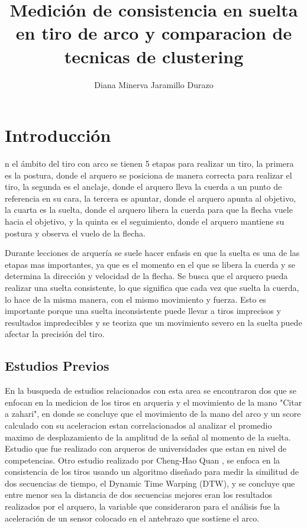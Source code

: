 \documentclass[11pt,a4paper,twocolumn,twoside]{rho-class/rho}
\title{Medición de consistencia en 
suelta en tiro de arco y comparacion de tecnicas de clustering}
\author[a]{Diana Minerva Jaramillo Durazo}
\affil[a]{Centro de Investigación Científica y de Educación Superior de Ensenada, Baja California, México.}
\begin{document}
    \maketitle
    \thispagestyle{firststyle}


\section{Introducción}

    n el ámbito del tiro con arco se tienen 5 etapas para realizar un tiro, la primera es la postura, donde el arquero se posiciona de manera correcta para realizar el tiro, la segunda es el anclaje, donde el arquero lleva la cuerda a un punto de referencia en su cara, la tercera es apuntar, donde el arquero apunta al objetivo, la cuarta es la suelta, donde el arquero libera la cuerda para que la flecha vuele hacia el objetivo, y la quinta es el seguimiento, donde el arquero mantiene su postura y observa el vuelo de la flecha. \cite{archerystages}
	
    Durante lecciones de arquería se suele hacer enfasis en que la suelta es una de las etapas mas importantes, ya que es el momento en el que se libera la cuerda y se determina la dirección y velocidad de la flecha. Se busca que el arquero pueda realizar una suelta consistente, lo que significa que cada vez que suelta la cuerda, lo hace de la misma manera, con el mismo movimiento y fuerza. Esto es importante porque una suelta inconsistente puede llevar a tiros imprecisos y resultados impredecibles y se teoriza que un movimiento severo en la suelta puede afectar la precisión del tiro. \cite{tahaCorrelationArchersHands2016c}


    \subsection{Estudios Previos}

        En la busqueda de estudios relacionados con esta area se encontraron dos que se enfocan en la medicion de los tiros en arqueria y el movimiento de la mano "Citar a zahari", en donde se concluye que el movimiento de la mano del arco y un score calculado con su aceleracion estan correlacionados al analizar el promedio maximo de desplazamiento de la amplitud de la señal al momento de la suelta. Estudio que fue realizado con arqueros de universidades que estan en nivel de competencias.
        Otro estudio realizado por Cheng-Hao Quan \cite{quanAnalysisShootingConsistency2017b}, se enfoca en la consistencia de los tiros usando un algoritmo diseñado para medir la similitud de dos secuencias de tiempo, el Dynamic Time Warping (DTW), y se concluye que entre menor sea la distancia de dos secuencias mejores eran los resultados realizados por el arquero, la variable que consideraron para el análisis fue la aceleración de un sensor colocado en el antebrazo que sostiene el arco.
\end{document}
